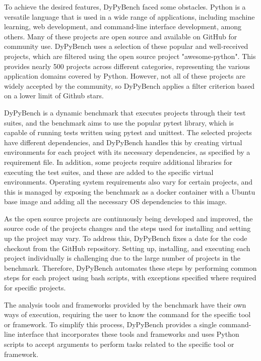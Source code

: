 To achieve the desired features, DyPyBench faced some obstacles. Python is a versatile language that is used in a wide range of applications, including machine learning, web development, and command-line interface development, among others. Many of these projects are open source and available on GitHub for community use. DyPyBench uses a selection of these popular and well-received projects, which are filtered using the open source project "awesome-python". This provides nearly 500 projects across different categories, representing the various application domains covered by Python. However, not all of these projects are widely accepted by the community, so DyPyBench applies a filter criterion based on a lower limit of Github stars.

DyPyBench is a dynamic benchmark that executes projects through their test suites, and the benchmark aims to use the popular pytest library, which is capable of running tests written using pytest and unittest. The selected projects have different dependencies, and DyPyBench handles this by creating virtual environments for each project with its necessary dependencies, as specified by a requirement file. In addition, some projects require additional libraries for executing the test suites, and these are added to the specific virtual environments. Operating system requirements also vary for certain projects, and this is managed by exposing the benchmark as a docker container with a Ubuntu base image and adding all the necessary OS dependencies to this image.

As the open source projects are continuously being developed and improved, the source code of the projects changes and the steps used for installing and setting up the project may vary. To address this, DyPyBench fixes a date for the code checkout from the GitHub repository. Setting up, installing, and executing each project individually is challenging due to the large number of projects in the benchmark. Therefore, DyPyBench automates these steps by performing common steps for each project using bash scripts, with exceptions specified where required for specific projects.

The analysis tools and frameworks provided by the benchmark have their own ways of execution, requiring the user to know the command for the specific tool or framework. To simplify this process, DyPyBench provides a single command-line interface that incorporates these tools and frameworks and uses Python scripts to accept arguments to perform tasks related to the specific tool or framework.
